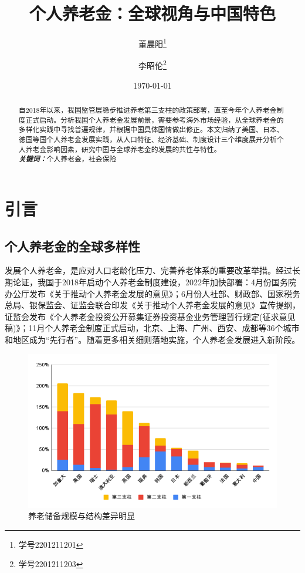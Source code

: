 \documentclass[a4paper,zihao=5]{ctexart}
\title{个人养老金：全球视角与中国特色}
\author{董晨阳\thanks{学号2201211201}\and 李昭伦\thanks{学号2201211203}}
\date{\today}
\providecommand{\keywords}[1]{\\\textbf{\textit{关键词：}}#1}
\begin{document}
\maketitle
\thispagestyle{empty}
\begin{abstract}
    自2018年以来，我国监管层稳步推进养老第三支柱的政策部署，直至今年个人养老金制度正式启动。分析我国个人养老金发展前景，需要参考海外市场经验，从全球养老金的多样化实践中寻找普遍规律，并根据中国具体国情做出修正。本文归纳了美国、日本、德国等国个人养老金发展实践，从人口特征、经济基础、制度设计三个维度展开分析个人养老金影响因素，研究中国与全球养老金的发展的共性与特性。
    \keywords{个人养老金，社会保险}
\end{abstract}
\setcounter{secnumdepth}{0}
\tableofcontents
\clearpage
\setcounter{page}{1}
\section{引言}
\subsection{个人养老金的全球多样性}
发展个人养老金，是应对人口老龄化压力、完善养老体系的重要改革举措。经过长期论证，我国于2018年启动个人养老金制度建设，2022年加快部署：4月份国务院办公厅发布《关于推动个人养老金发展的意见》；6月份人社部、财政部、国家税务总局、银保监会、证监会联合印发《关于推动个人养老金发展的意见》宣传提纲，证监会发布《个人养老金投资公开募集证券投资基金业务管理暂行规定(征求意见稿)》；11月个人养老金制度正式启动，北京、上海、广州、西安、成都等36个城市和地区成为“先行者”。随着更多相关细则落地实施，个人养老金发展进入新阶段。
\begin{figure}[H]
    \centering
    \includegraphics[width=\linewidth]{img/三支柱规模占GDP比重.png}
    \caption{养老储备规模与结构差异明显}
\end{figure}
\end{document}
